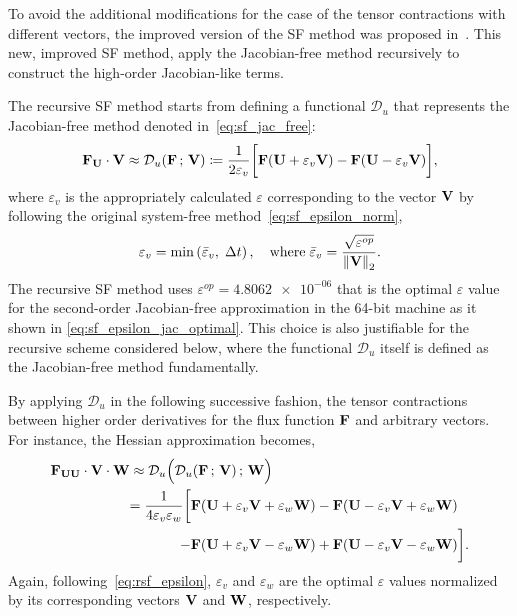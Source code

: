 To avoid the additional modifications for the case of the tensor contractions with different vectors,
the improved version of the SF method was proposed in~\cite{lee2021recursive}.
This new, improved SF method, apply the Jacobian-free method recursively to construct the high-order Jacobian-like terms.

The recursive SF method starts from defining a functional \( \mathcal{D}_{u} \)
that represents the Jacobian-free method denoted in~\cref{eq:sf_jac_free}:
\begin{equation}\label{eq:rsf_functional}
    \mathbf{F}_{\mathbf{U}} \cdot \mathbf{V} \approx \mathcal{D}_{u} (\mathbf{F} \,;\, \mathbf{V}) \coloneqq
    \frac{1}{2\varepsilon_{v}} \bigg[
        \mathbf{F}(\mathbf{U} + \varepsilon_{v} \mathbf{V}) - \mathbf{F}(\mathbf{U} - \varepsilon_{v} \mathbf{V})
    \bigg],
\end{equation}
where \( \varepsilon_{v} \) is the appropriately calculated \( \varepsilon \)
corresponding to the vector \( \mathbf{V} \)
by following the original system-free method~\cref{eq:sf_epsilon_norm},
\begin{equation}\label{eq:rsf_epsilon}
    \varepsilon_{v} = \min \left(\bar{\varepsilon}_{v}, \; \Delta t \right), \quad \text{where} \;
    \bar{\varepsilon}_{v} = \frac{\sqrt{\varepsilon^{op}}}{\left\lVert \mathbf{V} \right\rVert_{2}}.
\end{equation}
The recursive SF method uses \( \varepsilon^{op} = \num{4.8062e-06} \)
that is the optimal \( \varepsilon \) value
for the second-order Jacobian-free approximation in the 64-bit machine
as it shown in \cref{eq:sf_epsilon_jac_optimal}.
This choice is also justifiable for the recursive scheme considered below,
where the functional \( \mathcal{D}_{u} \) itself is defined as the Jacobian-free method fundamentally.

By applying \( \mathcal{D}_{u} \) in the following successive fashion,
the tensor contractions between higher order derivatives for
the flux function \( \mathbf{F} \) and arbitrary vectors.
For instance, the Hessian approximation becomes,
\begin{equation}\label{eq:rsf_hes_free}
    \begin{split}
        \mathbf{F}_{\mathbf{U} \mathbf{U}} \cdot \mathbf{V} \cdot \mathbf{W} &\approx
        \mathcal{D}_{u} \Big( \mathcal{D}_{u} (\mathbf{F} \,;\, \mathbf{V}) \,;\, \mathbf{W} \Big) \\
        &
        \begin{split}
            =\frac{1}{4 \varepsilon_{v} \varepsilon_{w}}
                \bigg[
                     &\mathbf{F}(\mathbf{U} + \varepsilon_{v} \mathbf{V} + \varepsilon_{w} \mathbf{W})
                    -\mathbf{F}(\mathbf{U} - \varepsilon_{v} \mathbf{V} + \varepsilon_{w} \mathbf{W})\\
                    -&\mathbf{F}(\mathbf{U} + \varepsilon_{v} \mathbf{V} - \varepsilon_{w} \mathbf{W})
                    +\mathbf{F}(\mathbf{U} - \varepsilon_{v} \mathbf{V} - \varepsilon_{w} \mathbf{W})
                \bigg].
        \end{split}
    \end{split}
\end{equation}
Again, following~\cref{eq:rsf_epsilon},
\( \varepsilon_{v} \) and \( \varepsilon_{w} \) are the optimal \( \varepsilon \) values
normalized by its corresponding vectors \( \mathbf{V} \) and \( \mathbf{W} \), respectively.

